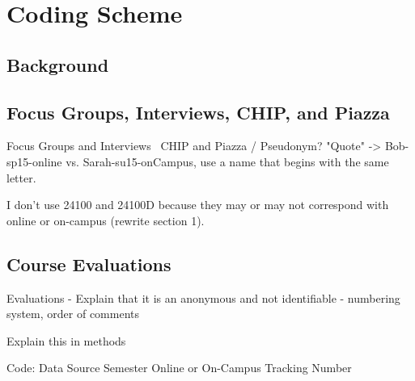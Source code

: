 \chapter[Coding Scheme]{Coding Scheme}

\section{Background}

\section{Focus Groups, Interviews, CHIP, and Piazza}

Focus Groups and Interviews \
CHIP and Piazza             /  Pseudonym? "Quote" -> Bob-sp15-online vs. Sarah-su15-onCampus, use a name that begins with the same letter.

I don't use 24100 and 24100D because they may or may not correspond with online or on-campus (rewrite section 1).

\section{Course Evaluations}

Evaluations - Explain that it is an anonymous and not identifiable - numbering system, order of comments

Explain this in methods

Code:
Data Source
Semester
Online or On-Campus
Tracking Number